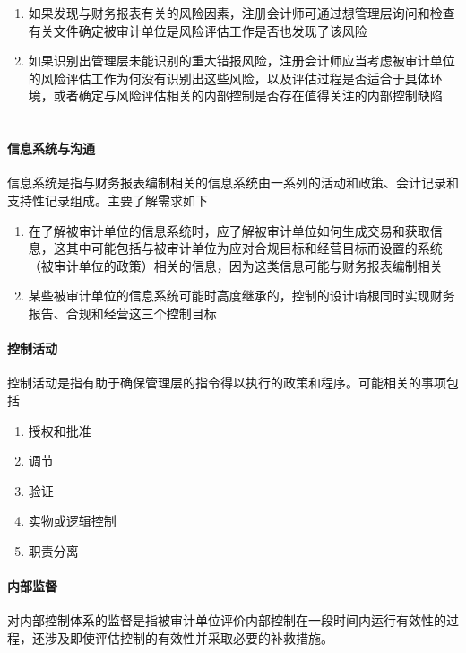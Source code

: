 \documentclass[UTF8,12pt]{ctexart}
\numberwithin{equation}{section} %
\numberwithin{figure}{section}
\numberwithin{table}{section}
\begin{document}
	\begin{enumerate}
		\item 如果发现与财务报表有关的风险因素，注册会计师可通过想管理层询问和检查有关文件确定被审计单位是风险评估工作是否也发现了该风险
	　	
	　	\item 如果识别出管理层未能识别的重大错报风险，注册会计师应当考虑被审计单位的风险评估工作为何没有识别出这些风险，以及评估过程是否适合于具体环境，或者确定与风险评估相关的内部控制是否存在值得关注的内部控制缺陷
	　	
	\end{enumerate}
	
	\paragraph{信息系统与沟通}
	信息系统是指与财务报表编制相关的信息系统由一系列的活动和政策、会计记录和支持性记录组成。主要了解需求如下
	\begin{enumerate}
		\item 在了解被审计单位的信息系统时，应了解被审计单位如何生成交易和获取信息，这其中可能包括与被审计单位为应对合规目标和经营目标而设置的系统（被审计单位的政策）相关的信息，因为这类信息可能与财务报表编制相关
		
		\item 某些被审计单位的信息系统可能时高度继承的，控制的设计啃根同时实现财务报告、合规和经营这三个控制目标
	\end{enumerate}
	
	\paragraph{控制活动}
	控制活动是指有助于确保管理层的指令得以执行的政策和程序。可能相关的事项包括
	\begin{enumerate}
		\item 授权和批准
		
		\item 调节
		
		\item 验证
		
		\item 实物或逻辑控制
		
		\item 职责分离
	\end{enumerate}
	
	\paragraph{内部监督}
	对内部控制体系的监督是指被审计单位评价内部控制在一段时间内运行有效性的过程，还涉及即使评估控制的有效性并采取必要的补救措施。
	
\end{document}
